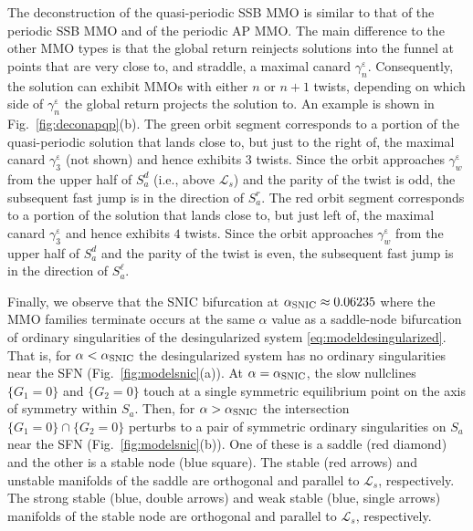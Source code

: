 \documentclass[10pt,onecolumn]{article}
\theoremstyle{plain}
\DeclareMathOperator{\eps}{\varepsilon}
\begin{document}
The deconstruction of the quasi-periodic SSB MMO is similar to that of the periodic SSB MMO and of the periodic AP MMO. 
The main difference to the other MMO types is that the global return reinjects solutions into the funnel at points that are very close to, and straddle, a maximal canard $\gamma_n^{\eps}$. 
Consequently, the solution can exhibit MMOs with either $n$ or $n+1$ twists, depending on which side of $\gamma_n^{\eps}$ the global return projects the solution to.
An example is shown in Fig.~\ref{fig:deconapqp}(b). 
The green orbit segment corresponds to a portion of the quasi-periodic solution that lands close to, but just to the right of, the maximal canard $\gamma_3^{\eps}$ (not shown) and hence exhibits $3$ twists. 
Since the orbit approaches $\gamma_w^{\eps}$ from the upper half of $S_a^d$ (i.e., above $\mathcal L_s$) and the parity of the twist is odd, the subsequent fast jump is in the direction of $S_a^r$. 
The red orbit segment corresponds to a portion of the solution that lands close to, but just left of, the maximal canard $\gamma_3^{\eps}$ and hence exhibits $4$ twists. 
Since the orbit approaches $\gamma_w^{\eps}$ from the upper half of $S_a^d$ and the parity of the twist is even, the subsequent fast jump is in the direction of $S_a^{\ell}$.

Finally, we observe that the SNIC bifurcation at $\alpha_{\rm SNIC} \approx 0.06235$ where the MMO families terminate occurs at the same $\alpha$ value as a saddle-node bifurcation of ordinary singularities of the desingularized system \eqref{eq:modeldesingularized}.
That is, for $\alpha < \alpha_{\rm SNIC}$ the desingularized system has no ordinary singularities near the SFN (Fig.~\ref{fig:modelsnic}(a)).  
At $\alpha = \alpha_{\rm SNIC}$, the slow nullclines $\{ G_1=0 \}$ and $\{ G_2 = 0 \}$ touch at a single symmetric equilibrium point on the axis of symmetry within $S_a$.
Then, for $\alpha > \alpha_{\rm SNIC}$ the intersection $\{ G_1=0 \} \cap \{ G_2 = 0 \}$ perturbs to a pair of symmetric ordinary singularities on $S_a$ near the SFN (Fig.~\ref{fig:modelsnic}(b)). One of these is a saddle (red diamond) and the other is a stable node (blue square). 
The stable (red arrows) and unstable manifolds of the saddle are orthogonal and parallel to $\mathcal L_s$, respectively. 
The strong stable (blue, double arrows) and weak stable (blue, single arrows) manifolds of the stable node are orthogonal and parallel to $\mathcal L_s$, respectively. 
\end{document}

